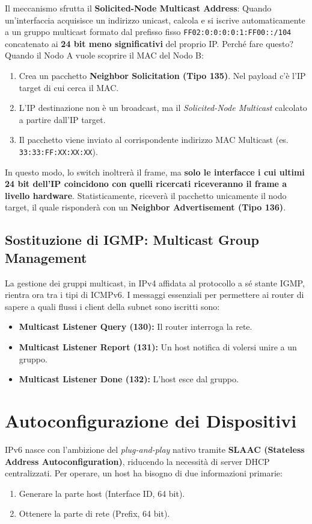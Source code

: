 Il meccanismo sfrutta il \textbf{Solicited-Node Multicast Address}:
Quando un'interfaccia acquisisce un indirizzo unicast, calcola e si iscrive automaticamente a un gruppo multicast formato dal prefisso fisso \texttt{FF02:0:0:0:0:1:FF00::/104} concatenato ai \textbf{24 bit meno significativi} del proprio IP.
Perché fare questo? Quando il Nodo A vuole scoprire il MAC del Nodo B:
\begin{enumerate}
    \item Crea un pacchetto \textbf{Neighbor Solicitation (Tipo 135)}. Nel payload c'è l'IP target di cui cerca il MAC.
    \item L'IP destinazione non è un broadcast, ma il \textit{Solicited-Node Multicast} calcolato a partire dall'IP target.
    \item Il pacchetto viene inviato al corrispondente indirizzo MAC Multicast (es. \texttt{33:33:FF:XX:XX:XX}).
\end{enumerate}
In questo modo, lo switch inoltrerà il frame, ma \textbf{solo le interfacce i cui ultimi 24 bit dell'IP coincidono con quelli ricercati riceveranno il frame a livello hardware}. Statisticamente, riceverà il pacchetto unicamente il nodo target, il quale risponderà con un \textbf{Neighbor Advertisement (Tipo 136)}. 

\subsection{Sostituzione di IGMP: Multicast Group Management}
La gestione dei gruppi multicast, in IPv4 affidata al protocollo a sé stante IGMP, rientra ora tra i tipi di ICMPv6. I messaggi essenziali per permettere ai router di sapere a quali flussi i client della subnet sono iscritti sono:
\begin{itemize}
    \item \textbf{Multicast Listener Query (130):} Il router interroga la rete.
    \item \textbf{Multicast Listener Report (131):} Un host notifica di volersi unire a un gruppo.
    \item \textbf{Multicast Listener Done (132):} L'host esce dal gruppo.
\end{itemize}

\section{Autoconfigurazione dei Dispositivi}

IPv6 nasce con l'ambizione del \textit{plug-and-play} nativo tramite \textbf{SLAAC (Stateless Address Autoconfiguration)}, riducendo la necessità di server DHCP centralizzati.
Per operare, un host ha bisogno di due informazioni primarie:
\begin{enumerate}
    \item Generare la parte host (Interface ID, 64 bit).
    \item Ottenere la parte di rete (Prefix, 64 bit).
\end{enumerate}

